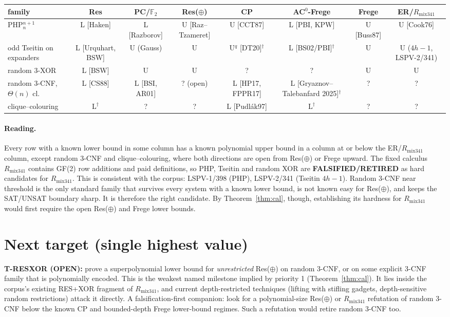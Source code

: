 \documentclass[11pt]{article}
\theoremstyle{definition}
\newcommand{\Rm}{R_{\mathrm{mix341}}}
\begin{document}
\begin{center}\small
\begin{tabular}{lccccccc}
\toprule
family & Res & PC/$\mathbb F_2$ & Res($\oplus$) & CP & AC$^0$-Frege & Frege & ER/$\Rm$\\
\midrule
PHP$^{n+1}_n$ & L [Haken] & L [Razborov] & U [Raz--Tzameret] & U [CCT87] & L [PBI, KPW] & U [Buss87] & U [Cook76]\\
odd Tseitin on expanders & L [Urquhart, BSW] & U (Gauss) & U & U$^{q}$ [DT20]$^\dagger$ & L [BS02/PBI]$^\dagger$ & U & U ($4h{-}1$, LSPV-2/341)\\
random 3-XOR & L [BSW] & U & U & ? & ? & U & U\\
random 3-CNF, $\Theta(n)$ cl. & L [CS88] & L [BSI, AR01] & ? (open) & L [HP17, FPPR17] & L [Gryaznov--Talebanfard 2025]$^\dagger$ & ? & ?\\
clique--colouring & L$^\dagger$ & ? & ? & L [Pudlák97] & L$^\dagger$ & ? & ?\\
\bottomrule
\end{tabular}
\end{center}

\paragraph{Reading.} Every row with a known lower bound in some column has a
known polynomial upper bound in a column at or below the ER/$\Rm$ column,
except random 3-CNF and clique--colouring, where both directions are open
from Res($\oplus$) or Frege upward. The fixed calculus $\Rm$ contains GF(2) row
additions and paid definitions, so PHP, Tseitin and random XOR are
\textbf{FALSIFIED/RETIRED} as hard candidates for $\Rm$. This is consistent
with the corpus: LSPV-1/398 (PHP), LSPV-2/341 (Tseitin $4h-1$). Random 3-CNF
near threshold is the only standard family that survives every system with
a known lower bound, is not known easy for Res($\oplus$), and keeps the
SAT/UNSAT boundary sharp. It is therefore the right candidate. By
Theorem~\ref{thm:cal}, though, establishing its hardness for $\Rm$ would
first require the open Res($\oplus$) and Frege lower bounds.

\section{Next target (single highest value)}
\textbf{T-RESXOR (OPEN):} prove a superpolynomial lower bound for
\emph{unrestricted} Res($\oplus$) on random 3-CNF, or on some explicit 3-CNF
family that is polynomially encoded. This is the weakest named milestone
implied by priority 1 (Theorem~\ref{thm:cal}). It lies inside the corpus's
existing RES+XOR fragment of $\Rm$, and current depth-restricted techniques
(lifting with stifling gadgets, depth-sensitive random restrictions) attack
it directly. A falsification-first companion: look for a polynomial-size
Res($\oplus$) or $\Rm$ refutation of random 3-CNF below the known CP and
bounded-depth Frege lower-bound regimes. Such a refutation would retire
random 3-CNF too.
\end{document}
